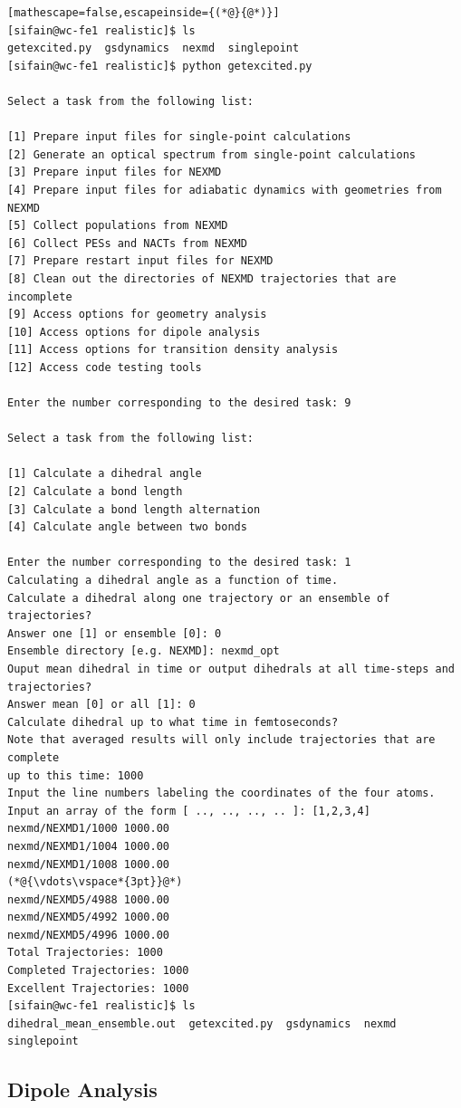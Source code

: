 \documentclass[letterpaper,12pt,titlepage]{article}
\begin{document}
\begin{lstlisting}[mathescape=false,escapeinside={(*@}{@*)}]
[sifain@wc-fe1 realistic]$ ls
getexcited.py  gsdynamics  nexmd  singlepoint
[sifain@wc-fe1 realistic]$ python getexcited.py 

Select a task from the following list:

[1] Prepare input files for single-point calculations
[2] Generate an optical spectrum from single-point calculations
[3] Prepare input files for NEXMD
[4] Prepare input files for adiabatic dynamics with geometries from NEXMD
[5] Collect populations from NEXMD
[6] Collect PESs and NACTs from NEXMD
[7] Prepare restart input files for NEXMD
[8] Clean out the directories of NEXMD trajectories that are incomplete
[9] Access options for geometry analysis
[10] Access options for dipole analysis
[11] Access options for transition density analysis
[12] Access code testing tools

Enter the number corresponding to the desired task: 9

Select a task from the following list:

[1] Calculate a dihedral angle
[2] Calculate a bond length
[3] Calculate a bond length alternation
[4] Calculate angle between two bonds

Enter the number corresponding to the desired task: 1
Calculating a dihedral angle as a function of time.
Calculate a dihedral along one trajectory or an ensemble of trajectories? 
Answer one [1] or ensemble [0]: 0
Ensemble directory [e.g. NEXMD]: nexmd_opt
Ouput mean dihedral in time or output dihedrals at all time-steps and trajectories? 
Answer mean [0] or all [1]: 0
Calculate dihedral up to what time in femtoseconds?
Note that averaged results will only include trajectories that are complete
up to this time: 1000
Input the line numbers labeling the coordinates of the four atoms.
Input an array of the form [ .., .., .., .. ]: [1,2,3,4]
nexmd/NEXMD1/1000 1000.00
nexmd/NEXMD1/1004 1000.00
nexmd/NEXMD1/1008 1000.00
(*@{\vdots\vspace*{3pt}}@*)
nexmd/NEXMD5/4988 1000.00
nexmd/NEXMD5/4992 1000.00
nexmd/NEXMD5/4996 1000.00
Total Trajectories: 1000
Completed Trajectories: 1000
Excellent Trajectories: 1000
[sifain@wc-fe1 realistic]$ ls
dihedral_mean_ensemble.out  getexcited.py  gsdynamics  nexmd  singlepoint
\end{lstlisting}

\newpage
\subsection{Dipole Analysis}
\label{dipanalysis}
\end{document}
